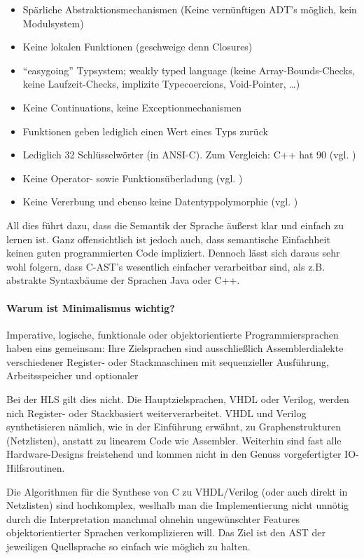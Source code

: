 \documentclass[oneside,a4paper]{article}
\begin{document}
\begin{itemize}
  \item Spärliche Abstraktionsmechanismen (Keine vernünftigen ADT's möglich,
    kein Modulsystem)
  \item Keine lokalen Funktionen (geschweige denn Closures)
  \item ``easygoing'' Typsystem; weakly typed language
    (keine Array-Bounds-Checks, keine Laufzeit-Checks,
    implizite Typecoercions, Void-Pointer, \ldots)
  \item Keine Continuations, keine Exceptionmechanismen
  \item Funktionen geben lediglich einen Wert eines Typs zurück
  \item Lediglich 32 Schlüsselwörter (in ANSI-C). Zum Vergleich: C++ hat 90
    (vgl. \cite{CPPREF})
  \item Keine Operator- sowie Funktionsüberladung (vgl. \cite{KRC})
  \item Keine Vererbung und ebenso keine Datentyppolymorphie (vgl. \cite{KRC})
\end{itemize}

All dies führt dazu, dass die Semantik der Sprache äußerst klar und einfach
zu lernen ist. Ganz offensichtlich ist jedoch auch,
dass semantische Einfachheit keinen
guten programmierten Code impliziert. Dennoch lässt sich daraus sehr wohl
folgern, dass C-AST's wesentlich einfacher verarbeitbar sind, als
z.B. abstrakte Syntaxbäume der Sprachen Java oder C++.

\paragraph{Warum ist Minimalismus wichtig?}
Imperative, logische, funktionale oder objektorientierte
Programmiersprachen haben eins gemeinsam: Ihre Zielsprachen
sind ausschließlich Assemblerdialekte verschiedener
Register- oder Stackmaschinen mit
sequenzieller Ausführung, Arbeitsspeicher und optionaler

Bei der HLS gilt dies nicht. Die Hauptzielsprachen, VHDL oder Verilog,
werden nich Register- oder Stackbasiert weiterverarbeitet.
VHDL und Verilog synthetisieren nämlich, wie in der Einführung erwähnt,
zu Graphenstrukturen (Netzlisten), anstatt zu linearem Code wie Assembler.
Weiterhin sind fast alle Hardware-Designs freistehend und
kommen nicht in den Genuss vorgefertigter IO-Hilfsroutinen.

Die Algorithmen für die Synthese von C zu VHDL/Verilog
(oder auch direkt in Netzlisten) sind hochkomplex, weslhalb man
die Implementierung nicht unnötig durch die Interpretation
manchmal ohnehin ungewünschter Features objektorientierter Sprachen
verkomplizieren will. Das Ziel ist den AST der jeweiligen Quellsprache
so einfach wie möglich zu halten.
\end{document}
